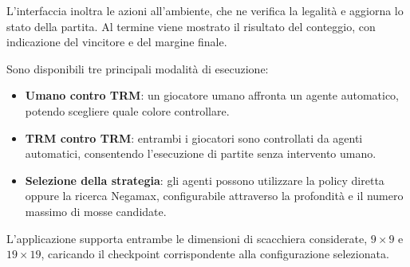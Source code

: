 L'interfaccia inoltra le azioni all'ambiente, che ne verifica la legalità e aggiorna lo stato della partita. Al termine viene mostrato il risultato del conteggio, con indicazione del vincitore e del margine finale.

Sono disponibili tre principali modalità di esecuzione:

\begin{itemize}
    \item \textbf{Umano contro TRM}: un giocatore umano affronta un agente automatico, potendo scegliere quale colore controllare.
    \item \textbf{TRM contro TRM}: entrambi i giocatori sono controllati da agenti automatici, consentendo l'esecuzione di partite senza intervento umano.
    \item \textbf{Selezione della strategia}: gli agenti possono utilizzare la policy diretta oppure la ricerca Negamax, configurabile attraverso la profondità e il numero massimo di mosse candidate.
\end{itemize}

L'applicazione supporta entrambe le dimensioni di scacchiera considerate, \(9\times9\) e \(19\times19\), caricando il checkpoint corrispondente alla configurazione selezionata.
